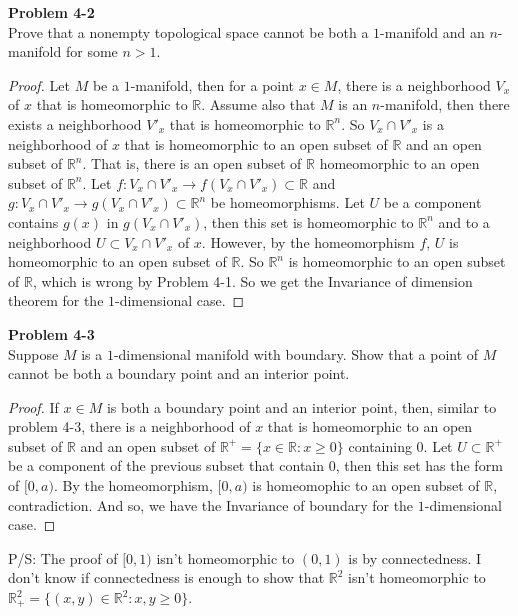 \documentclass[12pt, a4paper]{article}
\theoremstyle{plain}
\newcommand{\R}{\mathbb{R}}
\newenvironment{problem}[2][Problem]
    { \begin{mdframed}[backgroundcolor=gray!20] \textbf{#1 #2} \\}
    {  \end{mdframed}}
\begin{document}
\begin{problem}{4-2}
Prove that a nonempty topological space cannot be both a $1$-manifold and an $n$-manifold for some $n>1$.
\end{problem}
	\begin{proof}
	Let $M$ be a $1$-manifold, then for a point $x\in M$, there is a neighborhood $V_x$ of $x$ that is homeomorphic to $\R$. Assume also that $M$ is an $n$-manifold, then there exists a neighborhood $V'_x$ that is homeomorphic to $\R^n$. So $V_x\cap V'_x$ is a neighborhood of $x$ that is homeomorphic to an open subset of $\R$ and an open subset of $\R^n$. That is, there is an open subset of $\R$ homeomorphic to an open subset of $\R^n$. Let $f:V_x\cap V'_x\rightarrow f(V_x\cap V'_x)\subset \R$ and $g:V_x\cap V'_x\rightarrow g(V_x\cap V'_x)\subset \R^n$ be homeomorphisms. Let $U$ be a component contains $g(x)$ in $g(V_x\cap V'_x)$, then this set is homeomorphic to $\R^n$ and to a neighborhood $U\subset V_x\cap V'_x$ of $x$. However, by the homeomorphism $f$, $U$ is homeomorphic to an open subset of $\R$. So $\R^n$ is homeomorphic to an open subset of $\R$, which is wrong by Problem 4-1. So we get the Invariance of dimension theorem for the $1$-dimensional case.
	\end{proof}

\begin{problem}{4-3}
Suppose $M$ is a $1$-dimensional manifold with boundary. Show that a point of $M$ cannot be both a boundary point and an interior point.
\end{problem}
	\begin{proof}
	If $x\in M$ is both a boundary point and an interior point, then, similar to problem 4-3, there is a neighborhood of $x$ that is homeomorphic to an open subset of $\R$ and an open subset of $\R^+=\{x\in \R:x\geq 0\}$ containing $0$. Let $U\subset \R^+$ be a component of the previous subset that contain $0$, then this set has the form of $[0,a)$. By the homeomorphism, $[0,a)$ is homeomophic to an open subset of $\R$, contradiction. And so, we have the Invariance of boundary for the $1$-dimensional case.
	\end{proof}
	P/S: The proof of $[0,1)$ isn't homeomorphic to $(0,1)$ is by connectedness. I don't know if connectedness is enough to show that $\R^2$ isn't homeomorphic to $\R^2_+=\{(x,y)\in \R^2:x,y\geq 0\}$.
\end{document}
